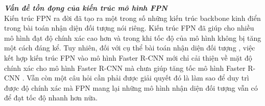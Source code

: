 {    \noindent
    \textbf{\textit{Vấn đề tồn đọng của kiến trúc mô hình FPN}} \\
    Kiến trúc FPN ra đời đã tạo ra một trong số những kiến trúc backbone  kinh điển trong bài toán nhận diện đối tượng  nói riêng.
    Kiến trúc FPN đã giúp cho nhiều mô hình đạt độ chính xác cao hơn và trong khi tốc độ của mô hình không bị tăng một cách đáng kể.
    Tuy nhiên, đối với cụ thể bài toán nhận diện đối tượng , việc kết hợp kiến trúc FPN vào mô hình Faster R-CNN  mới chỉ cải thiện về mặt độ chính xác cho mô hình Faster R-CNN  mà chưa giúp tăng tốc mô hình Faster R-CNN .
    Vẫn còn một câu hỏi cần phải được giải quyết đó là làm sao để duy trì được độ chính xác mà FPN mang lại những mô hình nhận diện đối tượng  vẫn có để đạt tốc độ nhanh hơn nữa.
}